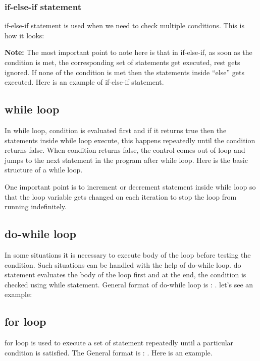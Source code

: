 \documentclass[11pt, a4paper]{article}
\begin{document}
\subsubsection{if-else-if statement}
if-else-if statement is used when we need to check multiple conditions. This is how it looks:

\textbf{Note:} The most important point to note here is that in if-else-if, as soon as the
condition is met, the corresponding set of statements get executed, rest gets ignored.
If none of the condition is met then the statements inside “else” gets executed.
Here is an example of if-else-if statement.


\subsection{while loop}
In while loop, condition is evaluated first and if it returns true then the statements
inside while loop execute, this happens repeatedly until the condition returns false.
When condition returns false, the control comes out of loop and jumps to the next statement
in the program after while loop. Here is the basic structure of a while loop.

One important point is to increment or decrement statement inside while loop so that the loop variable
gets changed on each iteration to stop the loop from running indefinitely.


\subsection{do-while loop}
In some situations it is necessary to execute body of the loop before testing the condition.
Such situations can be handled with the help of do-while loop. do statement evaluates the body
of the loop first and at the end, the condition is checked using while statement. General format
of do-while loop is : . let's see an example:


\subsection{for loop}
for loop is used to execute a set of statement repeatedly until a particular condition is satisfied.
The General format is : . Here
is an example.

\end{document}
